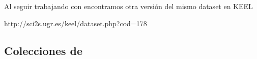 \ABIERTO
Al seguir trabajando con \mushroom encontramos otra versión del mismo dataset en KEEL

http://sci2s.ugr.es/keel/dataset.php?cod=178



\subsection{Colecciones de \CCs}
\label{sec:clasificacion:catalogo-comprimido:colecciones}
%
